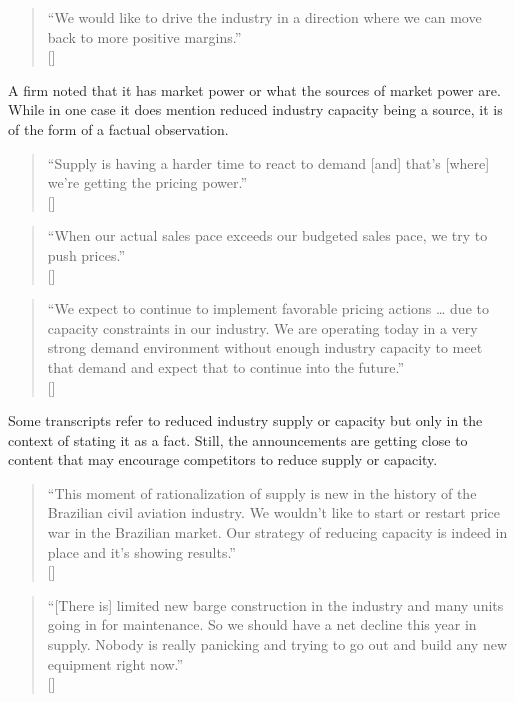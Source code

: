 \begin{quote}
``We would like to drive the industry in a direction where we can move back to more positive margins.'' \\
\mbox{[]}
\end{quote}

A firm noted that it has market power or what the sources of market power are. While in one case it does mention reduced industry capacity being a source, it is of the form of a factual observation.

\begin{quote}
``Supply is having a harder time to react to demand [and] that's [where] we're getting the pricing power.'' \\
\mbox{[]}
\end{quote}

\begin{quote}
``When our actual sales pace exceeds our budgeted sales pace, we try to push prices.'' \\
\mbox{[]}
\end{quote}

\begin{quote}
``We expect to continue to implement favorable pricing actions … due to capacity constraints in our industry. We are operating today in a very strong demand environment without enough industry capacity to meet that demand and expect that to continue into the future.'' \\
\mbox{[]}
\end{quote}

Some transcripts refer to reduced industry supply or capacity but only in the context of stating it as a fact. Still, the announcements are getting close to content that may encourage competitors to reduce supply or capacity.

\begin{quote}
``This moment of rationalization of supply is new in the history of the Brazilian civil aviation industry. We wouldn't like to start or restart price war in the Brazilian market. Our strategy of reducing capacity is indeed in place and it's showing results.'' \\
\mbox{[]}
\end{quote}

\begin{quote}
``[There is] limited new barge construction in the industry and many units going in for maintenance. So we should have a net decline this year in supply. Nobody is really panicking and trying to go out and build any new equipment right now.'' \\
\mbox{[]}
\end{quote}

